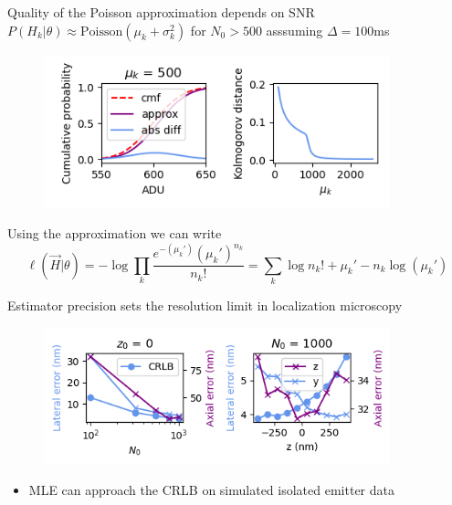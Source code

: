 \documentclass{beamer}					%
\begin{document}
\begin{frame}{Quality of the Poisson approximation depends on SNR}
$P(H_{k}|\theta)\approx \mathrm{Poisson}(\mu_{k}+\sigma_{k}^{2})$ for $N_{0} > 500$ asssuming $\Delta=100$ms 
\begin{figure}
\includegraphics[width=10cm]{Kolmogorov.png}
\end{figure}
Using the approximation we can write
\begin{equation*}
\ell(\vec{H}|\theta) = -\log \prod_{k} \frac{e^{-\left(\mu_{k}'\right)}\left(\mu_{k}'\right)^{n_{k}}}{n_{k}!} = \sum_{k}  \log n_{k}! + \mu_{k}' - n_{k}\log\left(\mu_{k}'\right)
\end{equation*}

\end{frame}

\begin{frame}{Estimator precision sets the resolution limit in localization microscopy}
\begin{figure}
\includegraphics[width=10cm]{Errors.png}
\end{figure}
\begin{itemize}
\item MLE can approach the CRLB on simulated isolated emitter data
\end{itemize}
\end{frame}
\end{document}
